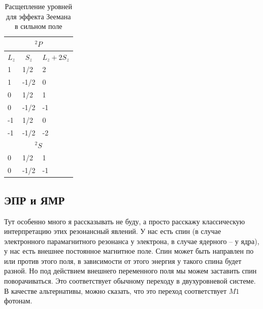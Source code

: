 \documentclass[12pt]{article}
\begin{document}
\begin{table}[]
\centering
\begin{tabular}{|l|l|l|}
\hline
\multicolumn{3}{|c|}{$^2P$}                                                                 \\ \hline
\multicolumn{1}{|c|}{$L_z$} & \multicolumn{1}{c|}{$S_z$} & \multicolumn{1}{c|}{$L_z+2S_z$} \\ \hline
1                          & 1/2                       & 2                               \\ \hline
1                          & -1/2                      & 0                               \\ \hline
0                          & 1/2                       & 1                               \\ \hline
0                          & -1/2                      & -1                              \\ \hline
-1                         & 1/2                       & 0                               \\ \hline
-1                         & -1/2                      & -2                              \\ \hline
\multicolumn{3}{|c|}{$^2S$}                                                                 \\ \hline
0                          & 1/2                       & 1                               \\ \hline
0                          & -1/2                      & -1                              \\ \hline
\end{tabular}
\caption{Расщепление уровней для эффекта Зеемана в сильном поле}
\end{table}

\subsection{ЭПР и ЯМР}
Тут особенно много я рассказывать не буду, а просто расскажу классическую интерпретацию этих резонансный явлений. У нас есть спин (в случае электронного парамагнитного резонанса у электрона, в случае ядерного -- у ядра), у нас есть внешнее постоянное магнитное поле. Спин может быть направлен по или против этого поля, в зависимости от этого энергия у такого спина будет разной. Но под действием внешнего переменного поля мы можем заставить спин поворачиваться. Это соответствует обычному переходу в двухуровневой системе. В качестве альтернативы, можно сказать, что это переход соответствует $M1$ фотонам.
\end{document}
